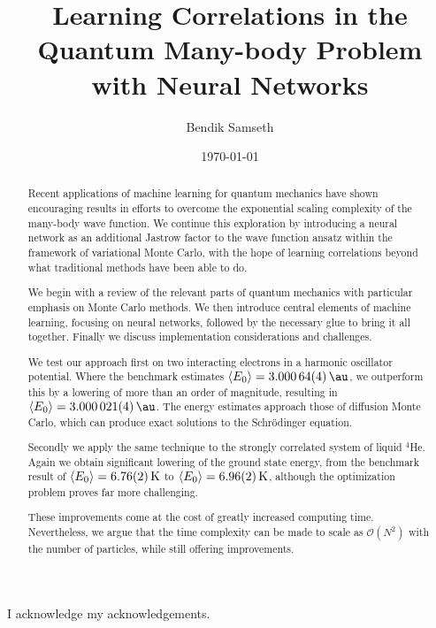 \documentclass[twoside,english]{uiofysmaster}
\author{Bendik Samseth}
\title{Learning Correlations in the Quantum Many-body Problem with Neural Networks}
\date{\monthyeardate\today}
\begin{document}
\maketitle

\begin{abstract}
Recent applications of machine learning for quantum mechanics have shown
encouraging results in efforts to overcome the exponential scaling complexity of
the many-body wave function. We continue this exploration by introducing a
neural network as an additional Jastrow factor to the wave function ansatz
within the framework of variational Monte Carlo, with the hope of learning
correlations beyond what traditional methods have been able to do.

We begin with a review of the relevant parts of quantum mechanics with particular
emphasis on Monte Carlo methods. We then introduce central elements of machine
learning, focusing on neural networks, followed by the necessary glue to bring
it all together. Finally we discuss implementation considerations and challenges.

We test our approach first on two interacting electrons in a harmonic oscillator
potential. Where the benchmark estimates $\expval{E_0}=\SI{3.00064(4)}{\au}$, we
outperform this by a lowering of more than an order of magnitude, resulting in
$\expval{E_0}=\SI{3.000021(4)}{\au}$. The energy estimates approach those of
diffusion Monte Carlo, which can produce exact solutions to the Schrödinger equation.

Secondly we apply the same technique to the strongly correlated system of liquid
$^4$He. Again we obtain significant lowering of the ground state energy, from
the benchmark result of $\expval{E_0}=\SI{6.76(2)}{\kelvin}$ to
$\expval{E_0}=\SI{6.96(2)}{\kelvin}$, although the optimization problem proves far
more challenging.

These improvements come at the cost of greatly increased computing time.
Nevertheless, we argue that the time complexity can be made to scale as
$\mathcal{O}(N^2)$ with the number of particles, while still offering improvements.
\end{abstract}



\begin{acknowledgements}
  I acknowledge my acknowledgements.
\end{acknowledgements}

\tableofcontents

\listoffigures
\begingroup
\let\clearpage\relax
\listoftables
\endgroup
\end{document}
